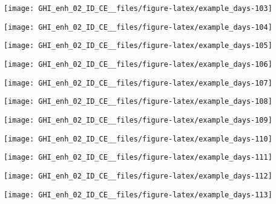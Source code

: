 \documentclass[
  10pt,
  a4paper,oneside]{article}
\begin{document}
\begin{center}\texttt{[image: GHI\_enh\_02\_ID\_CE\_\_files/figure-latex/example\_days-103]} \end{center}

\begin{center}\texttt{[image: GHI\_enh\_02\_ID\_CE\_\_files/figure-latex/example\_days-104]} \end{center}

\begin{center}\texttt{[image: GHI\_enh\_02\_ID\_CE\_\_files/figure-latex/example\_days-105]} \end{center}

\begin{center}\texttt{[image: GHI\_enh\_02\_ID\_CE\_\_files/figure-latex/example\_days-106]} \end{center}

\begin{center}\texttt{[image: GHI\_enh\_02\_ID\_CE\_\_files/figure-latex/example\_days-107]} \end{center}

\begin{center}\texttt{[image: GHI\_enh\_02\_ID\_CE\_\_files/figure-latex/example\_days-108]} \end{center}

\begin{center}\texttt{[image: GHI\_enh\_02\_ID\_CE\_\_files/figure-latex/example\_days-109]} \end{center}

\begin{center}\texttt{[image: GHI\_enh\_02\_ID\_CE\_\_files/figure-latex/example\_days-110]} \end{center}

\begin{center}\texttt{[image: GHI\_enh\_02\_ID\_CE\_\_files/figure-latex/example\_days-111]} \end{center}

\begin{center}\texttt{[image: GHI\_enh\_02\_ID\_CE\_\_files/figure-latex/example\_days-112]} \end{center}

\begin{center}\texttt{[image: GHI\_enh\_02\_ID\_CE\_\_files/figure-latex/example\_days-113]} \end{center}
\end{document}
